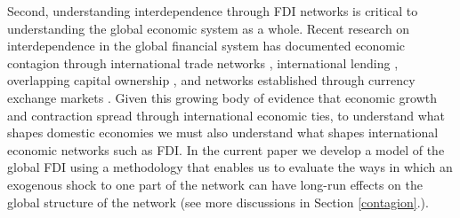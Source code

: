 \documentclass[reqno,onecolumn,letterpaper,12pt]{article}
\begin{document}

Second, understanding interdependence through FDI networks is critical to understanding the global economic system as a whole.  Recent research on interdependence in the global financial system has documented economic contagion through international trade networks \citep{kali2010financial,schiavo2010international},  international lending \citep{gai2010contagion,zakaria2017evidence,Oatley_et_al:2013}, overlapping capital ownership \citep{chuluun2017global}, and networks established through currency exchange markets \citep{brida2009symbolic,matesanz2014network}. Given this growing body of evidence that economic growth and contraction spread through international economic ties, to understand what shapes domestic economies we must also understand what shapes international economic networks such as FDI. In the current paper we develop a model of the global FDI using a methodology that enables us to evaluate the ways in which an exogenous shock to one part of the network can have long-run effects on the global structure of the network (see more discussions in Section \ref{contagion}.). %
\end{document}
